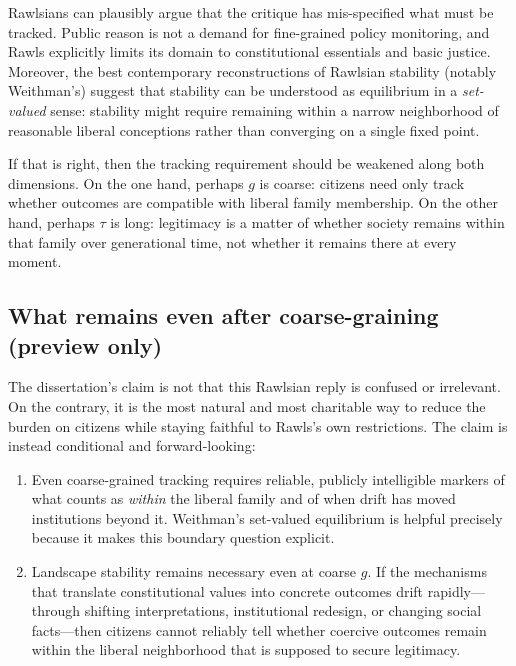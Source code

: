\documentclass[12pt]{report}
\begin{document}
Rawlsians can plausibly argue that the critique has mis-specified what must be tracked. Public reason is not a demand for fine-grained policy monitoring, and Rawls explicitly limits its domain to constitutional essentials and basic justice.\parencite[p.~767]{rawls1997public} Moreover, the best contemporary reconstructions of Rawlsian stability (notably Weithman’s) suggest that stability can be understood as equilibrium in a \emph{set-valued} sense: stability might require remaining within a narrow neighborhood of reasonable liberal conceptions rather than converging on a single fixed point.\parencite[pp.~205--206]{Weithman2023FixedPoints}

If that is right, then the tracking requirement should be weakened along both dimensions. On the one hand, perhaps \(g\) is coarse: citizens need only track whether outcomes are compatible with liberal family membership. On the other hand, perhaps \(\tau\) is long: legitimacy is a matter of whether society remains within that family over generational time, not whether it remains there at every moment.

\subsection{What remains even after coarse-graining (preview only)}

The dissertation’s claim is not that this Rawlsian reply is confused or irrelevant. On the contrary, it is the most natural and most charitable way to reduce the burden on citizens while staying faithful to Rawls’s own restrictions.\parencite[p.~767]{rawls1997public} The claim is instead conditional and forward-looking:

\begin{enumerate}
  \item Even coarse-grained tracking requires reliable, publicly intelligible markers of what counts as \emph{within} the liberal family and of when drift has moved institutions beyond it. Weithman’s set-valued equilibrium is helpful precisely because it makes this boundary question explicit.\parencite[pp.~205--206]{Weithman2023FixedPoints}
  \item Landscape stability remains necessary even at coarse \(g\). If the mechanisms that translate constitutional values into concrete outcomes drift rapidly---through shifting interpretations, institutional redesign, or changing social facts---then citizens cannot reliably tell whether coercive outcomes remain within the liberal neighborhood that is supposed to secure legitimacy.
\end{enumerate}
\end{document}

